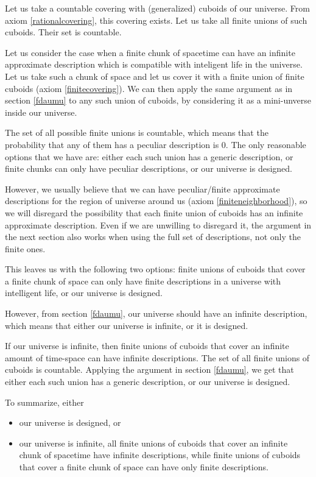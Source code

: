 \documentclass[a4paper
,draft
]{article}
\begin{document}
Let us take a countable covering with (generalized) cuboids of our universe.
From axiom \ref{rationalcovering}, this covering exists.
Let us take all finite unions of such cuboids. Their set is countable.

Let us consider the case when a finite chunk of spacetime can
have an infinite approximate
description which is compatible with inteligent life in the universe.
Let us take such a chunk of space and let us cover it with a finite union of
finite cuboids (axiom \ref{finitecovering}).
We can then apply the same argument as in section \ref{fdaumu} to any
such union of cuboids, by considering it as a mini-unverse inside
our universe.

The set of all possible finite unions is countable,
which means that the probability that any of them has a peculiar
description is $0$. The only reasonable options that we have are:
either each such union has a generic description,
or finite chunks can only have peculiar descriptions, or our universe
is designed.

However, we usually believe that we can have peculiar/finite
approximate descriptions
for the region of universe around us (axiom \ref{finiteneighborhood}), so we
will disregard the possibility that each finite union of cuboids has an
infinite approximate description. Even if we are unwilling to disregard it,
the argument in the next section also works when using the full set of
descriptions, not only the finite ones.

This leaves us with the following
two options: finite unions of cuboids that cover a finite chunk of space can
only have finite descriptions in a universe with intelligent life, or our
universe is designed.

However, from section \ref{fdaumu}, our universe should have an
infinite description, which means that either our universe is infinite,
or it is designed.

If our universe is infinite,
then finite unions of cuboids that cover an infinite
amount of time-space can have infinite descriptions. The set of all finite
unions of cuboids is countable.
Applying the argument
in section \ref{fdaumu}, we get that either each such union has a generic
description, or our universe is designed.

To summarize, either
\begin{itemize}
  \item our universe is designed, or
  \item our universe is infinite, all finite unions of
        cuboids that cover an infinite chunk of spacetime have infinite
        descriptions, while finite unions of cuboids that cover a finite chunk
        of space can have only finite descriptions.
\end{itemize}
\end{document}

